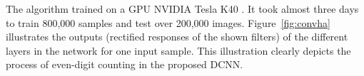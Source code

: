 
\noindent The algorithm trained on a GPU NVIDIA \cite{kirk2007nvidia} Tesla K40 \cite{lindholm2008nvidia}. It took almost three days to train 800,000 samples and test over 200,000 images. Figure~\ref{fig:convha} illustrates the outputs (rectified responses of the shown filters) of the different layers in the network for one input sample. This illustration clearly depicts the process of even-digit counting in the proposed DCNN.  %

